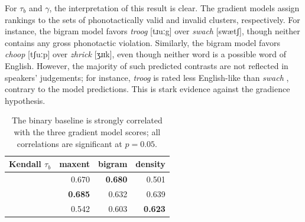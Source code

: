 For $\tau_b$ and $\gamma$, the interpretation of this result is clear. The gradient models assign rankings to the sets of phonotactically valid and invalid clusters, respectively. For instance, the bigram model favors \emph{troog} [tɹuːg] over \emph{swach} [swætʃ], though neither contains any gross phonotactic violation. Similarly, the bigram model favors \emph{choop} [tʃuːp] over \emph{zhrick} [ʒɹɪk], even though neither word is a possible word of English. However, the majority of such predicted contrasts are not reflected in speakers' judgements; for instance, \emph{troog} is rated less English-like than \emph{swach} \citep{Greenberg1964}, contrary to the model predictions. This is stark evidence against the gradience hypothesis.

\begin{table} \centering
\begin{tabular}{l r r r}
\toprule
Kendall $\tau_b$          & maxent         & bigram         & density  \\
\midrule
\citealt{Greenberg1964}   & 0.670          & \textbf{0.680} & 0.501 \\
\citealt{Scholes1966}     & \textbf{0.685} & 0.632          & 0.639 \\
\citealt{Albright2003b}   & 0.542          & 0.603          & \textbf{0.623} \\
\bottomrule
\end{tabular}
\caption{The binary baseline is strongly correlated with the three gradient model scores; all correlations are significant at $p = 0.05$.}
\label{bcor}
\end{table}

